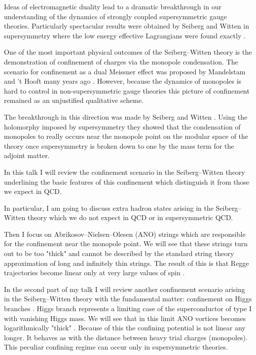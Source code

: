 \documentclass[a4paper,12pt]{article}
\begin{document}
Ideas of electromagnetic  duality \cite{1} lead to a dramatic
breakthrough in our understanding of the dynamics of strongly
coupled supersymmetric gauge theories. Particularly spectacular
results were obtained by Seiberg and Witten in \coordHE{}
supersymmetry where the low energy effective Lagrangians were
found exactly \cite{SW1,SW2}.

One of the most important physical outcomes of the
Seiberg--Witten theory is the demonstration of  confinement
of charges via the monopole condensation. The scenario for
confinement as a dual Meissner effect was proposed by Mandelstam
and 't Hooft many years ago \cite{MH}. However, because the
dynamics of monopoles is hard to control in non-supersymmetric
gauge theories this picture of confinement remained as an
unjustified qualitative scheme.

The breakthrough in this direction was made by Seiberg and
Witten \cite{SW1,SW2}. Using the holomorphy imposed by \coordHE{}
supersymmetry they showed that the condensation of monopoles to
really occurs near the monopole point on the modular space of
the theory once \coordHE{} supersymmetry is broken down to \coordHE{} one
by the mass term for the adjoint matter.

In this talk I will review the confinement scenario in the
Seiberg--Witten theory underlining the basic features of this
\coordHE{} confinement which distinguish it from those we expect in
QCD.

In particular, I am going to discuss extra hadron states arising
in the Seiberg--Witten theory which we do not expect in QCD or
in \coordHE{} supersymmetric QCD.

Then I focus on Abrikosov--Nielsen--Olesen (ANO) strings
\cite{ANO} which are responsible for the confinement near the
monopole point. We will see that these strings turn out to be
too "thick" and cannot be described by the standard string theory
approximation of long and infinitely thin strings. The result of
this is that Regge trajectories become linear only at very large
values of spin \coordHE{}.

In the second part of my talk I will review another confinement
scenario arising in the Seiberg--Witten theory with the fundamental
matter: confinement on Higgs branches \cite{SW2}. Higgs branch
represents a limiting case of the superconductor of type I with
vanishing Higgs mass. We will see that in this limit ANO
vortices becomes logarithmically "thick" \cite{Y}. Because of
this the confining potential is not linear any longer. It
behaves as \coordHE{} with the distance between heavy trial
charges (monopoles). This peculiar confining regime can occur
only in supersymmetric theories.
\end{document}
